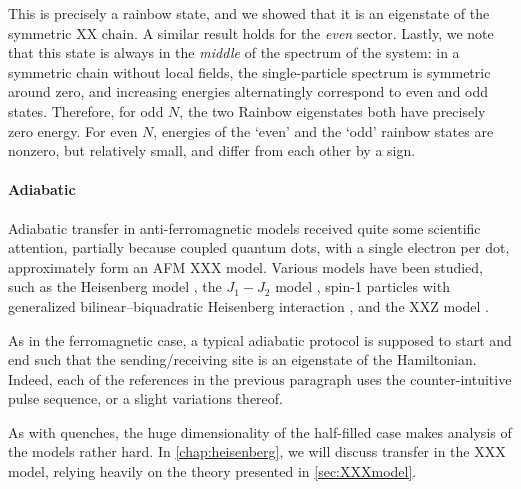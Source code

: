 This is precisely a rainbow state, and we showed that it is an eigenstate of the symmetric XX chain. A similar result holds for the \emph{even} sector. Lastly, we note that this state is always in the \emph{middle} of the spectrum of the system: in a symmetric chain without local fields, the single-particle spectrum is symmetric around zero, and increasing energies alternatingly correspond to even and odd states. Therefore, for odd $N$, the two Rainbow eigenstates both have precisely zero energy. For even $N$, energies of the `even' and the `odd' rainbow states are nonzero, but relatively small, and differ from each other by a sign. 



\paragraph{Adiabatic}
Adiabatic transfer in anti-ferromagnetic models received quite some scientific attention, partially because coupled quantum dots, with a single electron per dot, approximately form an AFM XXX model. Various models have been studied, such as the Heisenberg model \cite{Farooq2015,Agundez2017,Groenland2019}, the $J_1 - J_2$ model \cite{Chancellor2012}, spin-1 particles with generalized bilinear–biquadratic Heisenberg interaction \cite{Eckert2007}, and the XXZ model \cite{Oh2013}. 

As in the ferromagnetic case, a typical adiabatic protocol is supposed to start and end such that the sending/receiving site is an eigenstate of the Hamiltonian. Indeed, each of the references in the previous paragraph uses the counter-intuitive pulse sequence, or a slight variations thereof. 

As with quenches, the huge dimensionality of the half-filled case makes analysis of the models rather hard. In \cref{chap:heisenberg}, we will discuss transfer in the XXX model, relying heavily on the theory presented in \cref{sec:XXXmodel}.
 
%


